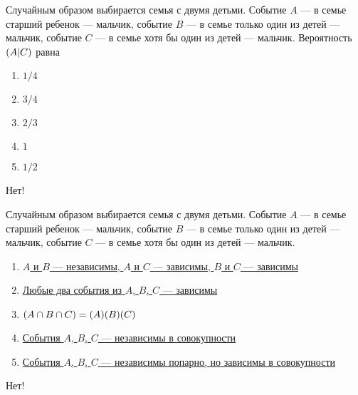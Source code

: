 \documentclass[t]{beamer}
\let\P\relax
\DeclareMathOperator{\P}{\mathbb{P}}
\begin{document}
 \begin{frame} \label{3-No} 
\begin{block}{3} 

Случайным образом выбирается семья с двумя детьми. Событие $A$ — в семье старший ребенок — мальчик,  событие $B$ — в семье только один из детей — мальчик, событие $C$ — в семье хотя бы один из детей — мальчик.  Вероятность $\P(A | C)$ равна
   


 \end{block} 
\begin{enumerate} 
\item[] \hyperlink{3-No}{\beamergotobutton{} $1/4$}
\item[] \hyperlink{3-No}{\beamergotobutton{} $3/4$
}
\item[] \hyperlink{3-Yes}{\beamergotobutton{} $2/3$}
\item[] \hyperlink{3-No}{\beamergotobutton{} $1$}
\item[] \hyperlink{3-No}{\beamergotobutton{} $1/2$}
\end{enumerate} 

 \alert{Нет!} 
\end{frame} 


 \begin{frame} \label{4-No} 
\begin{block}{4} 

Случайным образом выбирается семья с двумя детьми. Событие $A$ — в семье старший ребенок — мальчик,  событие $B$ — в семье только один из детей — мальчик, событие $C$ — в семье хотя бы один из детей — мальчик.


 \end{block} 
\begin{enumerate} 
\item[] \hyperlink{4-Yes}{\beamergotobutton{} $A$ и $B$ — независимы, $A$ и $C$ — зависимы, $B$ и $C$ — зависимы}
\item[] \hyperlink{4-No}{\beamergotobutton{} Любые два события из $A$, $B$, $C$ — зависимы}
\item[] \hyperlink{4-No}{\beamergotobutton{} $\P(A\cap B\cap C)=\P(A)\P(B)\P(C)$
}
\item[] \hyperlink{4-No}{\beamergotobutton{} События $A$, $B$, $C$ — независимы в совокупности}
\item[] \hyperlink{4-No}{\beamergotobutton{} События $A$, $B$, $C$ — независимы попарно, но зависимы в совокупности}
\end{enumerate} 

 \alert{Нет!} 
\end{frame} 
\end{document}
